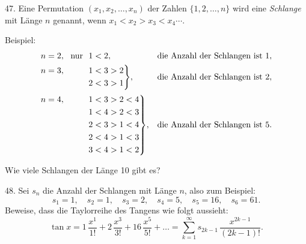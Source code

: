 \begin{problem}{47.}
	Eine Permutation $(x_1,x_2, \dotsc,x_n)$ der Zahlen $\{1, 2, \dotsc, n\}$ wird eine
	\emph{Schlange} mit Länge $n$ genannt, wenn $x_1<x_2>x_3<x_4 \dotsb$.

	\begin{note}{Beispiel:}
		\begin{equation*}
			\begin{aligned}[t]
				&\begin{aligned}[t] n=2, \text{\ \ nur\ \ } 1<2, \end{aligned} &&\text{die Anzahl der Schlangen ist }1, \\
				&\hskip-\nulldelimiterspace\mathord{\left.\begin{aligned} n=3, \hphantom{\text{\ \ nur\ \ }} 1&<3>2 \\ 
				2&<3>1\end{aligned} \right\}}, && \text{die Anzahl der Schlangen ist }2, \\[2pt]
				&\hskip-\nulldelimiterspace\mathord{\left.\begin{aligned} n=4, \hphantom{\text{\ \ nur\ \ }} 1&<3>2<4 \\ 
				1&<4>2<3 \\ 
				2&<3>1<4 \\ 
				2&<4>1<3 \\ 
				3&<4>1<2\end{aligned} \right\}},
				&&\text{die Anzahl der Schlangen ist }5. \\
			\end{aligned}
		\end{equation*}
	\end{note}
	Wie viele Schlangen der Länge 10 gibt es?
\end{problem}

\begin{problem}{48.}
	Sei $s_n$ die Anzahl der Schlangen mit Länge $n$, also zum Beispiel: 
	\begin{equation*}
		s_1=1, \quad s_2=1, \quad s_3=2, \quad s_4=5, \quad s_5=16, \quad s_6=61.
	\end{equation*}
	Beweise, dass die Taylorreihe des Tangens wie folgt aussieht: 
	\begin{equation*}
		\tan x=1\, \frac{x^1}{1!}+2\, \frac{x^3}{3!}+16\, \frac{x^5}{5!}+\dots=
		\textstyle\sum\limits_{k=1}^{\infty} s_{2k-1}\, \frac{x^{2k-1}}{(2k-1)!}.
	\end{equation*}
\end{problem}

